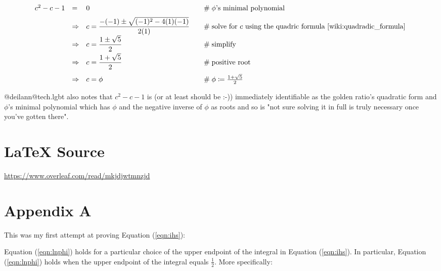 \documentclass{article}
\theoremstyle{definition}
\begin{document}
\begin{equation*}
\begin{array}{llll}
c^2 -c -1 
&=& 0
				&\hspace{1em} \mathrel{\#} \text{$\phi$'s minimal polynomial} \\
[6pt]
&\Rightarrow& c = \dfrac{-(-1) \pm \sqrt{(-1)^2 - 4 (1) (-1)}}{2(1)}	
				&\hspace{1em} \mathrel{\#} \text{solve for $c$ using the quadric 
								formula \cite{wiki:quadradic_formula} } \\
[6pt]
&\Rightarrow& c = \dfrac{1 \pm \sqrt{5}}{2}	
				&\hspace{1em} \mathrel{\#} \text{simplify} \\
[6pt]
&\Rightarrow& c = \dfrac{1 + \sqrt{5}}{2}	
				&\hspace{1em} \mathrel{\#} \text{positive root} \\
[10pt]
&\Rightarrow& c = \phi	
				&\hspace{1em} \mathrel{\#} \phi \coloneqq \frac{1 + \sqrt{5}}{2} \\

\end{array}
\end{equation*}


\bigskip
\noindent 
@deilann@tech.lgbt also notes that $c^2-c-1$ is (or at least should be :-)) immediately 
identifiable as the golden ratio's quadratic form and $\phi$'s minimal polynomial which 
has $\phi$ and the negative inverse of $\phi$ as roots and so is "not sure solving it 
in full is truly necessary once you've gotten there".
%
%
\section*{\LaTeX \hspace{0.10 mm} Source}
\url{https://www.overleaf.com/read/mkjdjwtmnzjd}
%
%
%


%
%
%
\section*{Appendix A}
This was my first attempt at proving Equation (\ref{eqn:ihs}):

\bigskip
\noindent
Equation (\ref{eqn:lnphi}) holds for a particular choice of the 
upper endpoint of the integral in Equation (\ref{eqn:ihs}). In 
particular, Equation (\ref{eqn:lnphi}) holds when the upper endpoint of the 
integral equals $\frac{1}{2}$. More specifically:
\end{document}
